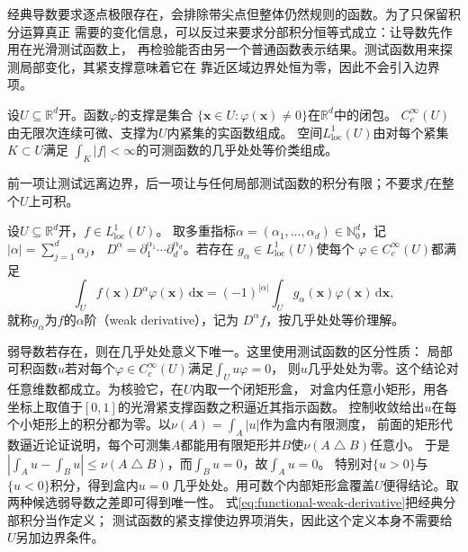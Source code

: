 经典导数要求逐点极限存在，会排除带尖点但整体仍然规则的函数。为了只保留积分运算真正
需要的变化信息，可以反过来要求分部积分恒等式成立：让导数先作用在光滑测试函数上，
再检验能否由另一个普通函数表示结果。测试函数用来探测局部变化，其紧支撑意味着它在
靠近区域边界处恒为零，因此不会引入边界项。
\begin{definition}[测试函数与局部可积性]
\label{def:functional-tests-local-integrability}
设$U\subseteq\mathbb R^d$开。函数$\varphi$的支撑是集合
$\{\bm x\in U:\varphi(\bm x)\neq0\}$在$\mathbb R^d$中的闭包。
$C_c^\infty(U)$由无限次连续可微、支撑为$U$内紧集的实函数组成。
空间$L^1_{\mathrm{loc}}(U)$由对每个紧集$K\subset U$满足
$\int_K|f|<\infty$的可测函数的几乎处处等价类组成。
\end{definition}
前一项让测试远离边界，后一项让与任何局部测试函数的积分有限；不要求$f$在整个$U$上可积。
\begin{definition}[弱导数]
\label{def:functional-weak-derivative}
设$U\subseteq\mathbb R^d$开，$f\in L^1_{\mathrm{loc}}(U)$。
取多重指标$\alpha=(\alpha_1,\ldots,\alpha_d)\in\mathbb{N}_0^d$，记
$|\alpha|=\sum_{j=1}^d\alpha_j$，
$D^\alpha=\partial_1^{\alpha_1}\cdots\partial_d^{\alpha_d}$。若存在
$g_\alpha\in L^1_{\mathrm{loc}}(U)$使每个
$\varphi\in C_c^\infty(U)$都满足
\begin{equation}
  \int_U f(\bm{x})D^\alpha\varphi(\bm{x})\,\mathrm{d}\bm{x}
  =
  (-1)^{|\alpha|}
  \int_U g_\alpha(\bm{x})\varphi(\bm{x})\,\mathrm{d}\bm{x},
  \label{eq:functional-weak-derivative}
\end{equation}
就称$g_\alpha$为$f$的$\alpha$阶（weak derivative），记为
$D^\alpha f$，按几乎处处等价理解。
\end{definition}
弱导数若存在，则在几乎处处意义下唯一。这里使用测试函数的区分性质：
局部可积函数$u$若对每个$\varphi\in C_c^\infty(U)$满足$\int_Uu\varphi=0$，
则$u$几乎处处为零。这个结论对任意维数都成立。为核验它，在$U$内取一个闭矩形盒，
对盒内任意小矩形，用各坐标上取值于$[0,1]$的光滑紧支撑函数之积逼近其指示函数。
控制收敛给出$u$在每个小矩形上的积分都为零。以$\nu(A)=\int_A|u|$作为盒内有限测度，
前面的矩形代数逼近论证说明，每个可测集$A$都能用有限矩形并$B$使$\nu(A\mathbin\triangle B)$任意小。
于是$|\int_Au-\int_Bu|\leq\nu(A\mathbin\triangle B)$，而$\int_Bu=0$，故$\int_Au=0$。
特别对$\{u>0\}$与$\{u<0\}$积分，得到盒内$u=0$
几乎处处。用可数个内部矩形盒覆盖$U$便得结论。取两种候选弱导数之差即可得到唯一性。
式\eqref{eq:functional-weak-derivative}把经典分部积分当作定义；
测试函数的紧支撑使边界项消失，因此这个定义本身不需要给$U$另加边界条件。


